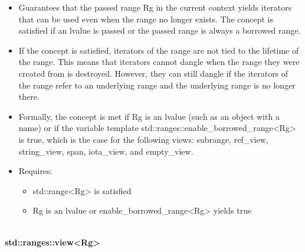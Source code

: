 \begin{itemize}
\item
Guarantees that the passed range Rg in the current context yields iterators that can be used even when the range no longer exists. The concept is satisfied if an lvalue is passed or the passed range is always a borrowed range.

\item
If the concept is satisfied, iterators of the range are not tied to the lifetime of the range. This means that iterators cannot dangle when the range they were created from is destroyed. However, they can still dangle if the iterators of the range refer to an underlying range and the underlying range is no longer there.

\item
Formally, the concept is met if Rg is an lvalue (such as an object with a name) or if the variable template std::ranges::enable\_borrowed\_range<Rg> is true, which is the case for the following views: subrange, ref\_view, string\_view, span, iota\_view, and empty\_view.

\item
Requires:

\begin{itemize}
\item
std::range<Rg> is satisfied

\item
Rg is an lvalue or enable\_borrowed\_range<Rg> yields true
\end{itemize}
\end{itemize}

\noindent
\hspace*{\fill} \\ %
\textbf{std::ranges::view<Rg>}

